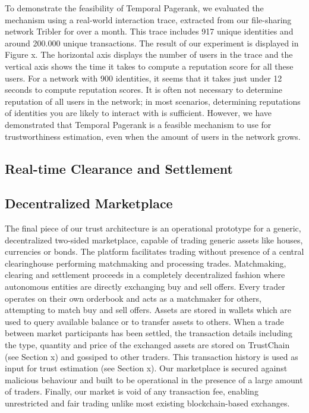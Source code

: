 \documentclass[USenglish]{article}
\begin{document}
To demonstrate the feasibility of Temporal Pagerank, we evaluated the mechanism using a real-world interaction trace, extracted from our file-sharing network Tribler for over a month.
This trace includes 917 unique identities and around 200.000 unique transactions.
The result of our experiment is displayed in Figure x.
The horizontal axis displays the number of users in the trace and the vertical axis shows the time it takes to compute a reputation score for all these users.
For a network with 900 identities, it seems that it takes just under 12 seconds to compute reputation scores.
It is often not necessary to determine reputation of all users in the network; in most scenarios, determining reputations of identities you are likely to interact with is sufficient.
However, we have demonstrated that Temporal Pagerank is a feasible mechanism to use for trustworthiness estimation, even when the amount of users in the network grows.

\subsection{Real-time Clearance and Settlement}

\subsection{Decentralized Marketplace}

The final piece of our trust architecture is an operational prototype for a generic, decentralized two-sided marketplace, capable of trading generic assets like houses, currencies or bonds.
The platform facilitates trading without presence of a central clearinghouse performing matchmaking and processing trades.
Matchmaking, clearing and settlement proceeds in a completely decentralized fashion where autonomous entities are directly exchanging buy and sell offers.
Every trader operates on their own orderbook and acts as a matchmaker for others, attempting to match buy and sell offers.
Assets are stored in wallets which are used to query available balance or to transfer assets to others.
When a trade between market participants has been settled, the transaction details including the type, quantity and price of the exchanged assets are stored on TrustChain (see Section x) and gossiped to other traders.
This transaction history is used as input for trust estimation (see Section x).
Our marketplace is secured against malicious behaviour and built to be operational in the presence of a large amount of traders.
Finally, our market is void of any transaction fee, enabling unrestricted and fair trading unlike most existing blockchain-based exchanges.
\end{document}
